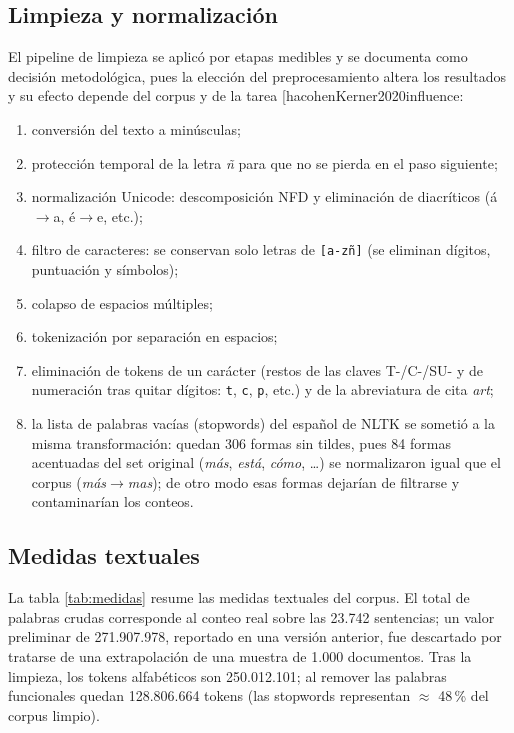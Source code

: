 \documentclass[11pt]{tg_usta}
\makeatletter
\renewcommand{\cite}{\@ifnextchar[{\@tempswatrue\@citex}{\@tempswafalse\@citex[]}}
\makeatother
\begin{document}
\subsection{Limpieza y normalización}
El pipeline de limpieza se aplicó por etapas medibles y se documenta como decisión metodológica, pues la elección del preprocesamiento altera los resultados y su efecto depende del corpus y de la tarea \cite{hacohenKerner2020influence}:
\begin{enumerate}
  \item conversión del texto a minúsculas;
  \item protección temporal de la letra \emph{ñ} para que no se pierda en el paso siguiente;
  \item normalización Unicode: descomposición NFD y eliminación de diacríticos (\'a$\rightarrow$a, \'e$\rightarrow$e, etc.);
  \item filtro de caracteres: se conservan solo letras de \texttt{[a-z\~n]} (se eliminan dígitos, puntuación y símbolos);
  \item colapso de espacios múltiples;
  \item tokenización por separación en espacios;
  \item eliminación de tokens de un carácter (restos de las claves T-/C-/SU- y de numeración tras quitar dígitos: \texttt{t}, \texttt{c}, \texttt{p}, etc.) y de la abreviatura de cita \emph{art};
  \item la lista de palabras vacías (stopwords) del español de NLTK se sometió a la misma transformación: quedan 306 formas sin tildes, pues 84 formas acentuadas del set original (\emph{más}, \emph{está}, \emph{cómo}, \ldots) se normalizaron igual que el corpus (\emph{más}$\rightarrow$\emph{mas}); de otro modo esas formas dejarían de filtrarse y contaminarían los conteos.
\end{enumerate}

\subsection{Medidas textuales}
La tabla \ref{tab:medidas} resume las medidas textuales del corpus. El total de palabras crudas corresponde al conteo real sobre las 23.742 sentencias; un valor preliminar de 271.907.978, reportado en una versión anterior, fue descartado por tratarse de una extrapolación de una muestra de 1.000 documentos. Tras la limpieza, los tokens alfabéticos son 250.012.101; al remover las palabras funcionales quedan 128.806.664 tokens (las stopwords representan $\approx$ 48\,\% del corpus limpio).
\end{document}
